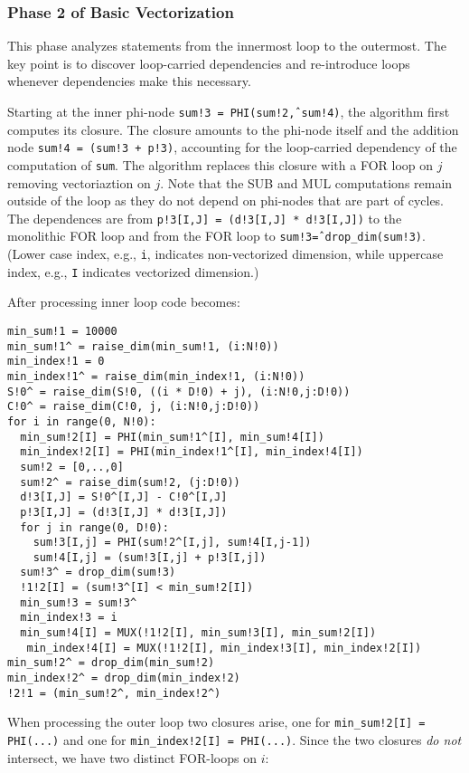 \subsubsection{Phase 2 of Basic Vectorization}

This phase analyzes statements from the innermost loop to the outermost. The key point is to discover loop-carried dependencies and re-introduce loops whenever dependencies make this necessary.

Starting at the inner phi-node \texttt{sum!3 = PHI(sum!2\^, sum!4)}, the algorithm first computes its closure. The closure amounts to the phi-node itself and the addition node \texttt{sum!4 = (sum!3 + p!3)}, accounting for the loop-carried dependency of the computation of \texttt{sum}. The algorithm replaces this closure with a FOR loop on $j$ removing vectoriaztion on $j$. Note that the SUB and MUL computations remain outside of the loop as they do not depend on phi-nodes that are part of cycles. The dependences are from \texttt{p!3[I,J] = (d!3[I,J] * d!3[I,J])} to the monolithic FOR loop and from the FOR loop to \texttt{sum!3\^ = drop\_dim(sum!3)}. (Lower case index, e.g., \texttt{i}, indicates non-vectorized dimension, while uppercase index, e.g., \texttt{I} indicates vectorized dimension.)

After processing inner loop code becomes:

{\small
\begin{verbatim}
min_sum!1 = 10000
min_sum!1^ = raise_dim(min_sum!1, (i:N!0))
min_index!1 = 0
min_index!1^ = raise_dim(min_index!1, (i:N!0))
S!0^ = raise_dim(S!0, ((i * D!0) + j), (i:N!0,j:D!0))
C!0^ = raise_dim(C!0, j, (i:N!0,j:D!0))
for i in range(0, N!0):
  min_sum!2[I] = PHI(min_sum!1^[I], min_sum!4[I]) 
  min_index!2[I] = PHI(min_index!1^[I], min_index!4[I])  
  sum!2 = [0,..,0] 
  sum!2^ = raise_dim(sum!2, (j:D!0))
  d!3[I,J] = S!0^[I,J] - C!0^[I,J]
  p!3[I,J] = (d!3[I,J] * d!3[I,J])
  for j in range(0, D!0):
    sum!3[I,j] = PHI(sum!2^[I,j], sum!4[I,j-1])       
    sum!4[I,j] = (sum!3[I,j] + p!3[I,j])
  sum!3^ = drop_dim(sum!3)     
  !1!2[I] = (sum!3^[I] < min_sum!2[I])
  min_sum!3 = sum!3^
  min_index!3 = i
  min_sum!4[I] = MUX(!1!2[I], min_sum!3[I], min_sum!2[I])
   min_index!4[I] = MUX(!1!2[I], min_index!3[I], min_index!2[I])
min_sum!2^ = drop_dim(min_sum!2)
min_index!2^ = drop_dim(min_index!2)   
!2!1 = (min_sum!2^, min_index!2^)
\end{verbatim}
}

When processing the outer loop two closures arise, one for \texttt{min\_sum!2[I] = PHI(...)} and one 
for \texttt{min\_index!2[I] = PHI(...)}. Since the two closures \emph{do not} intersect, we have two distinct FOR-loops on $i$:

